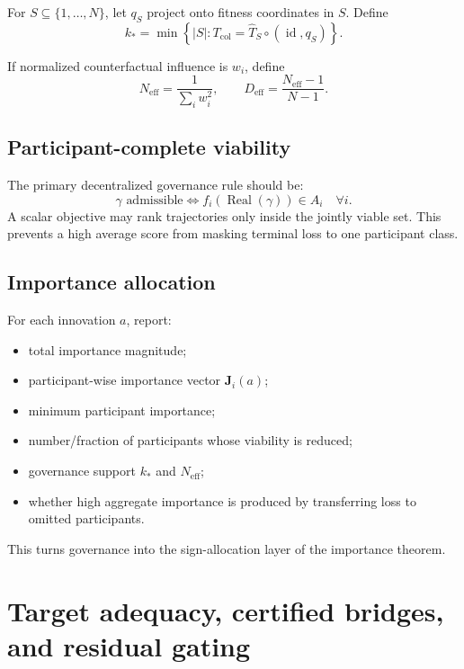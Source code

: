 \documentclass[11pt]{article}
\newcommand{\Real}{\operatorname{Real}}
\begin{document}
For $S\subseteq\{1,\ldots,N\}$, let $q_S$ project onto fitness coordinates in $S$. Define
\begin{equation}
k_\ast
=
\min\left\{|S|:T_{\mathrm{col}}=\widehat T_S\circ(\operatorname{id},q_S)\right\}.
\end{equation}

If normalized counterfactual influence is $w_i$, define
\begin{equation}
N_{\mathrm{eff}}=\frac{1}{\sum_iw_i^2},
\qquad
D_{\mathrm{eff}}=\frac{N_{\mathrm{eff}}-1}{N-1}.
\end{equation}

\subsection{Participant-complete viability}

The primary decentralized governance rule should be:
\begin{equation}
\gamma\text{ admissible}
\Longleftrightarrow
f_i(\Real(\gamma))\in A_i\quad\forall i.
\end{equation}
A scalar objective may rank trajectories only inside the jointly viable set. This prevents a high average score from
masking terminal loss to one participant class.

\subsection{Importance allocation}

For each innovation $a$, report:
\begin{itemize}
\item total importance magnitude;
\item participant-wise importance vector $\mathbf J_i(a)$;
\item minimum participant importance;
\item number/fraction of participants whose viability is reduced;
\item governance support $k_\ast$ and $N_{\mathrm{eff}}$;
\item whether high aggregate importance is produced by transferring loss to omitted participants.
\end{itemize}

This turns governance into the sign-allocation layer of the importance theorem.

\section{Target adequacy, certified bridges, and residual gating}
\end{document}
